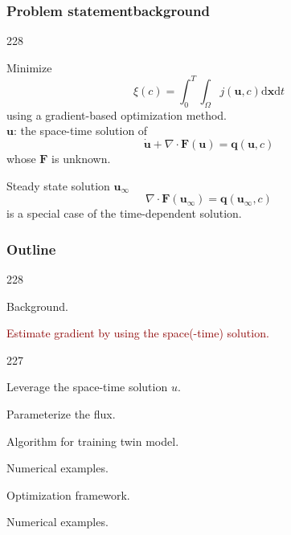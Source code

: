 \documentclass{beamer}
\newcommand{\barrow}{\item[\color{darkred}\ding{228}]}
\newcommand{\carrow}{\item[\color{darkred}\ding{227}]}
\begin{document}
\begin{frame}
    \frametitle{Problem statement\hfill \scriptsize{background}}\small
    \begin{dinglist}{228}
        \barrow 
        Minimize 
        $$
           \xi(c) = \int_0^T \int_\Omega j(\boldsymbol{u},c) \textrm{d}\mathbf{x}\textrm{d}t
        $$
        using a gradient-based optimization method.\\

        $\boldsymbol{u}$: the space-time solution of
        \begin{equation*}
            \dot{\boldsymbol{u}} + \nabla \cdot {\boldsymbol{F}}
            (\boldsymbol{u})
            = \boldsymbol{q}(\boldsymbol{u},c)
        \end{equation*}
        whose $\boldsymbol{F}$ is unknown.
        \barrow 
        Steady state solution $\boldsymbol{u}_\infty$
        \begin{equation*} 
            \nabla \cdot {\boldsymbol{F}}
            (\boldsymbol{u}_\infty)
            = \boldsymbol{q}(\boldsymbol{u}_\infty,c)
        \end{equation*}
        is a special case of the time-dependent solution.
    \end{dinglist}
\end{frame}





\setcounter{framenumber}{5}
\begin{frame}
    \frametitle{Outline}\small
    \begin{dinglist}{228}
        \barrow {}Background.
        \barrow \textcolor{darkred}{Estimate gradient by using the space(-time) solution.}
        \begin{dinglist}{227}
            \carrow Leverage the space-time solution $u$.
            \carrow Parameterize the flux.
            \carrow Algorithm for training twin model.
            \carrow Numerical examples.
        \end{dinglist}
        \barrow Optimization framework.
        \barrow Numerical examples.
    \end{dinglist}
\end{frame}
\end{document}
